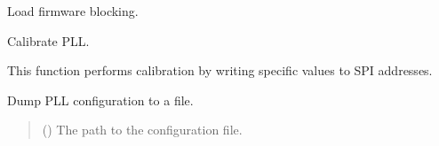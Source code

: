 \documentclass[letterpaper,10pt,english]{sphinxmanual}
\begin{document}
\begin{fulllineitems}
\begin{fulllineitems}
\begin{quote}
\begin{description}
\end{description}\end{quote}

\end{fulllineitems}


\begin{fulllineitems}
\label{\detokenize{apidocs:management.MANAGEMENT.load_firmware_blocking}}
\pysigstartsignatures
{}
\pysigstopsignatures
\sphinxAtStartPar
Load firmware blocking.

\end{fulllineitems}


\begin{fulllineitems}
\label{\detokenize{apidocs:management.MANAGEMENT.pll_calib}}
\pysigstartsignatures
{}
\pysigstopsignatures
\sphinxAtStartPar
Calibrate PLL.

\sphinxAtStartPar
This function performs calibration by writing specific values to SPI addresses.
\begin{quote}\begin{description}
\sphinxAtStartPar
{} \textendash{} 

\end{description}\end{quote}

\end{fulllineitems}


\begin{fulllineitems}
\label{\detokenize{apidocs:management.MANAGEMENT.pll_dumpcfg}}
\pysigstartsignatures
{}
\pysigstopsignatures
\sphinxAtStartPar
Dump PLL configuration to a file.
\begin{quote}\begin{description}
\sphinxAtStartPar
{} () \textendash{} The path to the configuration file.


\end{description}
\end{quote}
\end{fulllineitems}
\end{fulllineitems}
\end{document}
